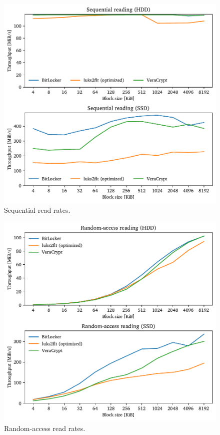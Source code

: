 \begin{figure}[htb!]
	\center
	\includegraphics[scale=1]{../fig/performance.hwexperiments.optseq.pdf}
	\caption[
		Sequential read rates
	]{
		Sequential read rates. 
	}
	\label{fig:performance.hwexperiments.optseq}
\end{figure}

\begin{figure}[htb!]
	\center
	\includegraphics[scale=1]{../fig/performance.hwexperiments.optrand.pdf}
	\caption[
		Random-access read rates
	]{
		Random-access read rates. 
	}
	\label{fig:performance.hwexperiments.optrand}
\end{figure}

